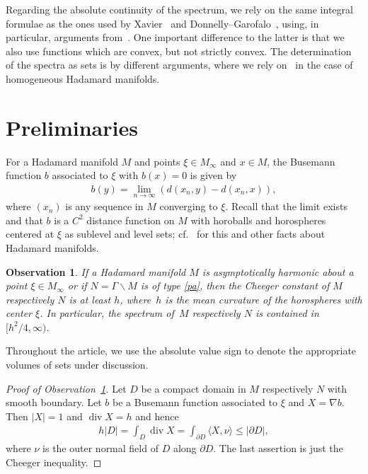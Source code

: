 \documentclass[pdftex]{sigma}
\numberwithin{equation}{section}
\newtheorem{obs}[Theorem]{Observation}
 { \theoremstyle{definition}
\newtheorem{Definition}[Theorem]{Definition}
\newtheorem{Note}[Theorem]{Note}
\newtheorem{Example}[Theorem]{Example}
\newtheorem{Remark}[Theorem]{Remark}
\newtheorem{exas}[Theorem]{Examples}
\newtheorem{exa}[Theorem]{Example}}
\DeclareMathOperator{\diver}{div}
\begin{document}
Regarding the absolute continuity of the spectrum,
we rely on the same integral formulae as the ones used by Xavier~\cite{Xavier1988} and Donnelly--Garofalo~\cite{DoGa92,DoGa97},
using, in particular, arguments from~\cite{Xavier1988}.
One important difference to the latter is that we also use functions which are convex,
but not strictly convex.
The determination of the spectra as sets is by different arguments,
where we rely on~\cite{P21} in the case of homogeneous Hadamard manifolds.

\section{Preliminaries}

For a Hadamard manifold $M$ and points $\xi\in M_\infty$ and $x\in M$,
the Busemann function $b$ associated to $\xi$ with $b(x)=0$ is given by
\begin{align*}
	b(y) = \lim_{n\to\infty} (d(x_n,y)-d(x_n,x)),
\end{align*}
where $(x_n)$ is any sequence in $M$ converging to $\xi$.
Recall that the limit exists and that $b$ is a $C^2$ distance function on $M$
with horoballs and horospheres centered at $\xi$ as sublevel and level sets;
cf.~\cite{Ba95} for this and other facts about Hadamard manifolds.

\begin{obs}\label{chee}
If a Hadamard manifold $M$ is asymptotically harmonic about a point $\xi\in M_\infty$
or if $N=\Gamma\backslash M$ is of type {\rm \ref{pa}},
then the Cheeger constant of $M$ respectively $N$ is at least $h$,
where~$h$ is the mean curvature of the horospheres with center $\xi$.
In particular, the spectrum of~$M$ respectively $N$ is contained in $\bigl[h^2/4,\infty\bigr)$.
\end{obs}

Throughout the article,
we use the absolute value sign to denote the appropriate volumes of sets under discussion.

\begin{proof}[Proof of Observation~\ref{chee}]
Let $D$ be a compact domain in $M$ respectively $N$ with smooth boundary.
Let $b$ be a Busemann function associated to $\xi$ and $X=\nabla b$.
Then $|X|=1$ and $\diver X=h$ and hence
\begin{align*}
	h|D| = \int_D\diver X = \int_{\partial D}\langle X,\nu\rangle \le |\partial D|,
\end{align*}
where $\nu$ is the outer normal field of $D$ along $\partial D$.
The last assertion is just the Cheeger in\-equality.
\end{proof}
\end{document}
